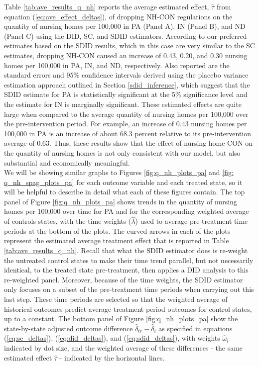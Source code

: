 \documentclass[../Main.tex]{subfiles}
\begin{document}
\indent Table \ref{tab:ave_results_q_nh} reports the average estimated effect, $\hat{\tau}$ from equation (\ref{eq:ave_effect_deltas}), of dropping NH-CON regulations on the quantity of nursing homes per 100,000 in PA (Panel A), IN (Panel B), and ND (Panel C) using the DID, SC, and SDID estimators. According to our preferred estimates based on the SDID results, which in this case are very similar to the SC estimates, dropping NH-CON caused an increase of 0.43, 0.20, and 0.30 nursing homes per 100,000 in PA, IN, and ND, respectively. Also reported are the standard errors and 95\% confidence intervals derived using the placebo variance estimation approach outlined in Section \ref{sdid_inference}, which suggest that the SDID estimate for PA is statistically significant at the 5\% significance level and the estimate for IN is marginally significant. These estimated effects are quite large when compared to the average quantity of nursing homes per 100,000 over the pre-intervention period. For example, an increase of 0.43 nursing homes per 100,000 in PA is an increase of about 68.3 percent relative to its pre-intervention average of 0.63. Thus, these results show that the effect of nursing home CON on the quantity of nursing homes is not only consistent with our model, but also substantial and economically meaningful.  \\
\indent We will be showing similar graphs to Figures \ref{fig:q_nh_plots_pa} and \ref{fig: q_nh_spag_plots_pa} for each outcome variable and each treated state, so it will be helpful to describe in detail what each of these figures contain. The top panel of Figure \ref{fig:q_nh_plots_pa} shows trends in the quantity of nursing homes per 100,000 over time for PA and for the corresponding weighted average of controls states, with the time weights ($\hat{\lambda}$) used to average pre-treatment time periods at the bottom of the plots. The curved arrows in each of the plots represent the estimated average treatment effect that is reported in Table \ref{tab:ave_results_q_nh}. Recall that what the SDID estimator does is re-weight the untreated control states to make their time trend parallel, but not necessarily identical, to the treated state pre-treatment, then applies a DID analysis to this re-weighted panel. Moreover, because of the time weights, the SDID estimator only focuses on a subset of the pre-treatment time periods when carrying out this last step. These time periods are selected so that the weighted average of historical outcomes predict average treatment period outcomes for control states, up to a constant. The bottom panel of Figure \ref{fig:q_nh_plots_pa} show the state-by-state adjusted outcome difference $\hat{\delta}_{tr}-\hat{\delta}_i$ as specified in equations (\ref{eq:sc_deltas}), (\ref{eq:did_deltas}), and (\ref{eq:sdid_deltas}), with weights $\hat{\omega}_i$ indicated by dot size, and the weighted average of these differences - the same estimated effect $\hat{\tau}$ - indicated by the horizontal lines.\\
\end{document}
